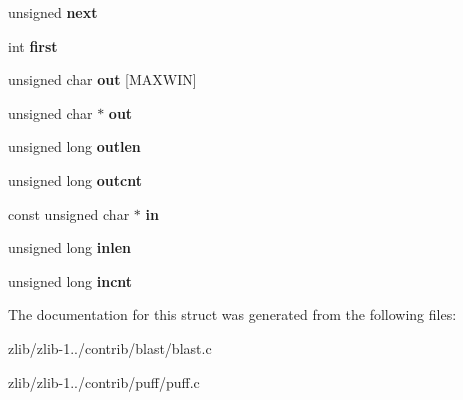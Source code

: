 \begin{DoxyCompactItemize}
\item 
\hypertarget{structstate_a28b7b290446097eacaf079dd73f07d6d}{unsigned {\bfseries next}}\label{structstate_a28b7b290446097eacaf079dd73f07d6d}

\item 
\hypertarget{structstate_a9bf57de222a785e228911d1af0aff14a}{int {\bfseries first}}\label{structstate_a9bf57de222a785e228911d1af0aff14a}

\item 
\hypertarget{structstate_a434898ec0d56089ad2e4312ef3fe3c14}{unsigned char {\bfseries out} \mbox{[}M\+A\+X\+W\+I\+N\mbox{]}}\label{structstate_a434898ec0d56089ad2e4312ef3fe3c14}

\item 
\hypertarget{structstate_a8802c4d6ed3336d4d1f9a1ca86e0b1eb}{unsigned char $\ast$ {\bfseries out}}\label{structstate_a8802c4d6ed3336d4d1f9a1ca86e0b1eb}

\item 
\hypertarget{structstate_aaebd08f33d7abe207a4de1527a64cd73}{unsigned long {\bfseries outlen}}\label{structstate_aaebd08f33d7abe207a4de1527a64cd73}

\item 
\hypertarget{structstate_a1b2e28e1c4dcc49af3858035fffde8c2}{unsigned long {\bfseries outcnt}}\label{structstate_a1b2e28e1c4dcc49af3858035fffde8c2}

\item 
\hypertarget{structstate_ae83ad4097b413d5cce216cd9642cdf36}{const unsigned char $\ast$ {\bfseries in}}\label{structstate_ae83ad4097b413d5cce216cd9642cdf36}

\item 
\hypertarget{structstate_af4a6c0ae835bf45ee8b31b77fc1244c5}{unsigned long {\bfseries inlen}}\label{structstate_af4a6c0ae835bf45ee8b31b77fc1244c5}

\item 
\hypertarget{structstate_a62991c0e1ba7aede1c8f81104a6e1646}{unsigned long {\bfseries incnt}}\label{structstate_a62991c0e1ba7aede1c8f81104a6e1646}

\end{DoxyCompactItemize}


The documentation for this struct was generated from the following files\+:\begin{DoxyCompactItemize}
\item 
zlib/zlib-\/1../contrib/blast/blast.\+c\item 
zlib/zlib-\/1../contrib/puff/puff.\+c\end{DoxyCompactItemize}
